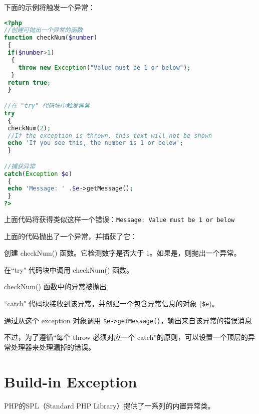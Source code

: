 下面的示例将触发一个异常：

\begin{lstlisting}[language=PHP]
<?php
//创建可抛出一个异常的函数
function checkNum($number)
 {
 if($number>1)
  {
    throw new Exception("Value must be 1 or below");
  }
 return true;
 }

//在 "try" 代码块中触发异常
try
 {
 checkNum(2);
 //If the exception is thrown, this text will not be shown
 echo 'If you see this, the number is 1 or below';
 }

//捕获异常
catch(Exception $e)
 {
 echo 'Message: ' .$e->getMessage();
 }
?>
\end{lstlisting}


上面代码将获得类似这样一个错误：\verb|Message: Value must be 1 or below|

上面的代码抛出了一个异常，并捕获了它：

\begin{compactenum}
\item 创建 checkNum() 函数。它检测数字是否大于 1。如果是，则抛出一个异常。
\item 在``try" 代码块中调用 checkNum() 函数。
\item checkNum() 函数中的异常被抛出
\item ``catch" 代码块接收到该异常，并创建一个包含异常信息的对象 (\texttt{\$e})。
\item 通过从这个 exception 对象调用 \texttt{\$e->getMessage()}，输出来自该异常的错误消息
\end{compactenum}

不过，为了遵循“每个 throw 必须对应一个 catch”的原则，可以设置一个顶层的异常处理器来处理漏掉的错误。

\section{Build-in Exception}

PHP的SPL（Standard PHP Library）提供了一系列的内置异常类。


